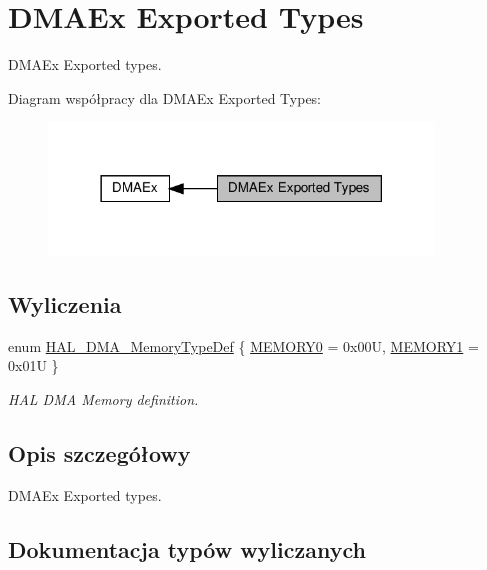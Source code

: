 \hypertarget{group___d_m_a_ex___exported___types}{}\section{D\+M\+A\+Ex Exported Types}
\label{group___d_m_a_ex___exported___types}


D\+M\+A\+Ex Exported types.  


Diagram współpracy dla D\+M\+A\+Ex Exported Types\+:\nopagebreak
\begin{figure}[H]
\begin{center}
\leavevmode
\includegraphics[width=290pt]{group___d_m_a_ex___exported___types}
\end{center}
\end{figure}
\subsection*{Wyliczenia}
\begin{DoxyCompactItemize}
\item 
enum \hyperlink{group___d_m_a_ex___exported___types_ga9cec283a461e47eda968838c35fd6eed}{H\+A\+L\+\_\+\+D\+M\+A\+\_\+\+Memory\+Type\+Def} \{ \hyperlink{group___d_m_a_ex___exported___types_gga9cec283a461e47eda968838c35fd6eeda2dec05a318eee29371114f1a8f6fe3f4}{M\+E\+M\+O\+R\+Y0} = 0x00U, 
\hyperlink{group___d_m_a_ex___exported___types_gga9cec283a461e47eda968838c35fd6eeda06080dfa68716b5bbf425d9232b144c3}{M\+E\+M\+O\+R\+Y1} = 0x01U
 \}\begin{DoxyCompactList}\small\item\em H\+AL D\+MA Memory definition. \end{DoxyCompactList}
\end{DoxyCompactItemize}


\subsection{Opis szczegółowy}
D\+M\+A\+Ex Exported types. 



\subsection{Dokumentacja typów wyliczanych}
\mbox{\label{group___d_m_a_ex___exported___types_ga9cec283a461e47eda968838c35fd6eed}} 
